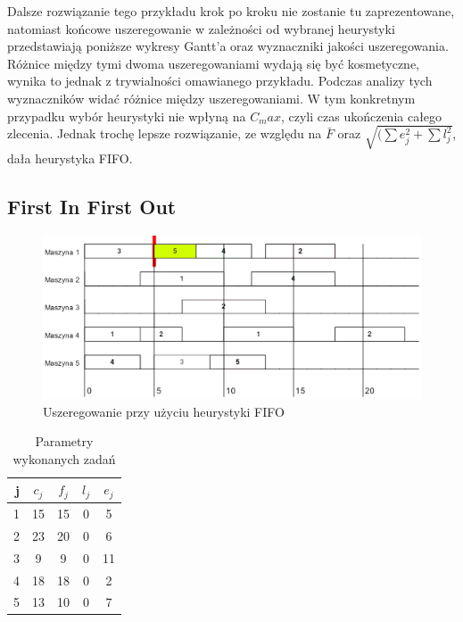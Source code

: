 \documentclass[twoside]{kInzynierka}
\begin{document}
Dalsze rozwiązanie tego przykładu krok po kroku nie zostanie tu zaprezentowane, natomiast końcowe uszeregowanie w zależności od wybranej heurystyki przedstawiają poniższe wykresy Gantt'a oraz wyznaczniki jakości uszeregowania. Różnice między tymi dwoma uszeregowaniami wydają się być kosmetyczne, wynika to jednak z trywialności omawianego przykładu. Podczas analizy tych wyznaczników widać różnice między uszeregowaniami. W tym konkretnym przypadku wybór heurystyki nie wpłyną na \(C_max\), czyli czas ukończenia całego zlecenia. Jednak trochę lepsze rozwiązanie, ze względu na \(\bar{F}\) oraz \(\sqrt{(\sum e_j^2 + \sum l_j^2}\), dała heurystyka FIFO.

\FloatBarrier
\newpage
\subsection{First In First Out}

\begin{figure}[htb]
    \centering
    \includegraphics[width=\textwidth, keepaspectratio=true]{./obrazki/fifo}
    \caption{Uszeregowanie przy użyciu heurystyki FIFO}
\end{figure}

\begin{table}[htb]
	\centering
	\caption{Parametry wykonanych zadań}
	\begin{tabular}{ | r | c | c | c | c |}
	\hline
	j	& \(c_j\)	& \(f_j\)	& \(l_j\)	& \(e_j\)	\\ \hline
	1	& 15	& 15	& 0	& 5	\\ \hline
	2	& 23	& 20	& 0	& 6	\\ \hline
	3	& 9	& 9	& 0	& 11	\\ \hline
	4	& 18	& 18	& 0	& 2	\\ \hline
	5	& 13	& 10	& 0	& 7	\\ \hline
	\end{tabular}
\end{table}
\end{document}
